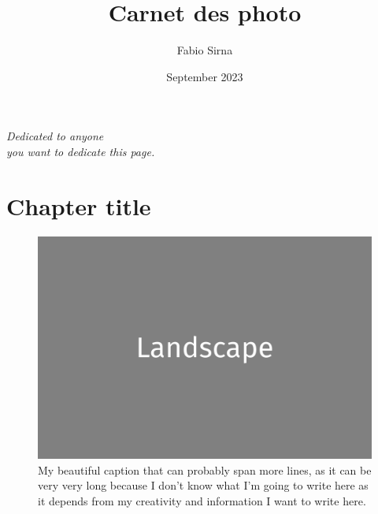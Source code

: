 \documentclass[a4paper,twoside]{book}
\newcommand{\blankpage}{\newpage\hbox{}\thispagestyle{empty}\newpage}
\begin{document}

\frontmatter 

\color{Black}
\title{Carnet des photo}
\author{Fabio Sirna}
\date{September 2023}

\maketitle

\mainmatter 

%
%

\thispagestyle{empty} %

\begin{flushright}
    \emph{Dedicated to anyone}\\
    \emph{you want to dedicate this page.}\\
\end{flushright}


\chapter*{Chapter title}

\blankpage

\clearpage

\begin{figure}[H]
	\includegraphics[width=\textwidth]{landscape.png}
	\caption{My beautiful caption that can probably span more lines, as it can be very very long because I don't know what I'm going to write here as it depends from my creativity and information I want to write here.}
\end{figure}
\end{document}

